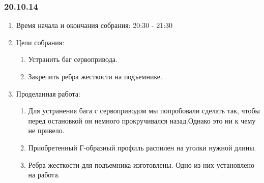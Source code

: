 	
\subsubsection{20.10.14}

\begin{enumerate}
	\item Время начала и окончания собрания:
	20:30 - 21:30
	\item Цели собрания:
	\begin{enumerate}
	  \item Устранить баг сервопривода.
	  
	  \item Закрепить ребра жесткости на подъемнике.
	  
    \end{enumerate}
    
	\item Проделанная работа:
	\begin{enumerate}
	  \item Для устранения бага с сервоприводом мы попробовали сделать так, чтобы перед остановкой он немного прокручивался назад.Однако это ни к чему не привело.
      
      \item Приобретенный Г-образный профиль распилен на уголки нужной длины.
      
      \item Ребра жесткости для подъемника изготовлены. Одно из них установлено на работа.
      

\end{enumerate}
\end{enumerate}
